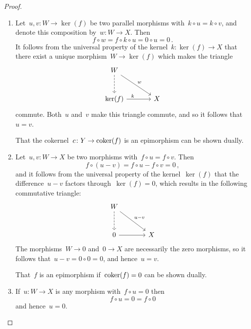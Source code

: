 \begin{proof}
  \leavevmode
  \begin{enumerate}
    \item
      Let~$u, v \colon W \to \ker(f)$ be two parallel morphisms with~$k \circ u = k \circ v$, and denote this composition by~$w \colon W \to X$.
      Then
      \[
          f \circ w
        = f \circ k \circ u
        = 0 \circ u
        = 0 \,.
      \]
      It follows from the universal property of the kernel~$k \colon \ker(f) \to X$ that there exist a unique morphism~$W \to \ker(f)$ which makes the triangle
      \[
        \begin{tikzcd}[sep = large]
            W
            \arrow[dashed]{d}
            \arrow{dr}[above right]{w}
          & {}
          \\
            \ker(f)
            \arrow{r}[above, near start]{k}
          & X
        \end{tikzcd}
      \]
      commute.
      Both~$u$ and~$v$ make this triangle commute, and so it follows that~$u = v$.
      
      That the cokernel~$c \colon Y \to \operatorname{coker}(f)$ is an epimorphism can be shown dually.
    \item
      Let~$u,v \colon W \to X$ be two morphisms with~$f \circ u = f \circ v$.
      Then
      \[
          f \circ (u-v)
        = f \circ u - f \circ v
        = 0 \,,
      \]
      and it follows from the universal property of the kernel~$\ker(f)$ that the difference~$u-v$ factors through~$\ker(f) = 0$, which results in the following commutative triangle:
      \[
        \begin{tikzcd}[sep = large]
            W
            \arrow[dashed]{d}
            \arrow{dr}[above right]{u-v}
          & {}
          \\
            0
            \arrow{r}
          & X
        \end{tikzcd}
      \]
      The morphisms~$W \to 0$ and~$0 \to X$ are necessarily the zero morphisms, so it follows that~$u-v = 0 \circ 0 = 0$, and hence~$u = v$.
      
      That~$f$ is an epimorphism if~$\operatorname{coker}(f) = 0$ can be shown dually.
    \item
      If~$u \colon W \to X$ is any morphism with~$f \circ u = 0$ then
      \[
          f \circ u
        = 0
        = f \circ 0
      \]
      and hence~$u = 0$.
      

\end{enumerate}
\end{proof}
